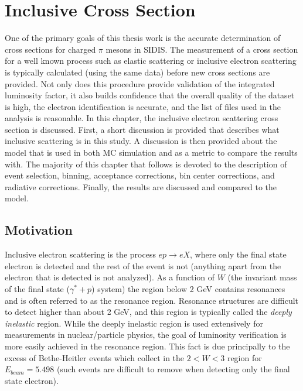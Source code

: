 %

\chapter{Inclusive Cross Section}

One of the primary goals of this thesis work is the accurate determination of cross sections for charged $\pi$ mesons in SIDIS.  The measurement of a cross section for a well known process such as elastic scattering or inclusive electron scattering is typically calculated (using the same data) before new cross sections are provided.  Not only does this procedure provide validation of the integrated luminosity factor, it also builds confidence that the overall quality of the dataset is high, the electron identification is accurate, and the list of files used in the analysis is reasonable.  In this chapter, the inclusive electron scattering cross section is discussed.  First, a short discussion is provided that describes what inclusive scattering is in this study.  A discussion is then provided about the model that is used in both MC simulation and as a metric to compare the results with.  The majority of this chapter that follows is devoted to the description of event selection, binning, acceptance corrections, bin center corrections, and radiative corrections.  Finally, the results are discussed and compared to the model.  \\

\section{Motivation}
Inclusive electron scattering is the process $e p \rightarrow e X$, where only the final state electron is detected and the rest of the event is not (anything apart from the electron that is detected is not analyzed).  As a function of $W$ (the invariant mass of the final state ($\gamma^* + p$) system) the region below 2 GeV contains resonances and is often referred to as the resonance region.  Resonance structures are difficult to detect higher than about 2 GeV, and this region is typically called the \textit{deeply inelastic} region.  While the deeply inelastic region is used extensively for measurements in nuclear/particle physics, the goal of luminosity verification is more easily achieved in the resonance region.  This fact is due principally to the excess of Bethe-Heitler events which collect in the $2 < W < 3$ region for $E_{beam} = 5.498$ (such events are difficult to remove when detecting only the final state electron). \\


